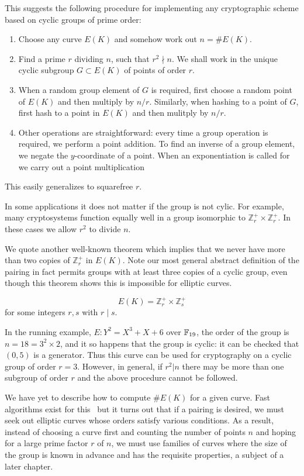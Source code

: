 This suggests the following procedure for implementing any cryptographic
scheme based on cyclic groups of prime order:

\begin{enumerate}
\item
Choose any curve $E(K)$ and somehow work out $n = \#E(K)$.
\item
Find a prime $r$ dividing $n$, such that $r^2 \nmid n$.
We shall work in the unique cyclic subgroup $G \subset E(K)$ of points
of order $r$.
\item
When a random group element of $G$ is required, first choose a random point
of $E(K)$ and then multiply by $n / r$. Similarly, when hashing to
a point of $G$, first hash to a point in $E(K)$ and then mulitply by
$n / r$.
\item
Other operations are straightforward: every time a group
operation is required, we perform a point addition. To find an inverse
of a group element, we negate the $y$-coordinate of a point. When
an exponentiation is called for we carry out a point multiplication
\end{enumerate}

This easily generalizes to squarefree $r$.

In some applications it does not matter if the group is not
cylic. For example, many cryptosystems function equally well
in a group isomorphic to $\mathbb{Z}_{r}^+ \times \mathbb{Z}_{r}^+$.
In these cases we allow $r^2$ to divide $n$.

We quote another well-known theorem which implies that we
never have more than two copies of $\mathbb{Z}_r^+$ in
$E(K)$.
Note our most general abstract definition of the pairing in fact permits
groups with at least three copies of a cyclic group, even though this
theorem shows this is impossible for elliptic curves.

\begin{theorem}
\[ E(K) = \mathbb{Z}_r^+ \times \mathbb{Z}_s^+ \]
for some integers $r,s$ with $r \mid s$.
\end{theorem}

In the running example, $E : Y^2 = X^3 + X + 6$ over $\mathbb{F}_{19}$,
the order of the group is $n = 18 = 3^2 \times 2$, and it so happens
that the group is cyclic: it can be checked that $(0,5)$ is a generator.
Thus this curve can be used
for cryptography on a cyclic group of order $r = 3$. However, in general,
if $r^2 | n$ there may be more than one subgroup of order $r$ and the
above procedure cannot be followed.

We have yet to describe how to compute $\#E(K)$ for a given curve.
Fast algorithms exist for this~\cite{bss}
but it turns out that if a pairing is desired, we must seek out
elliptic curves whose orders satisfy various conditions.
As a result,
instead of choosing a curve first and counting the number of points $n$ and
hoping for a large prime factor $r$ of $n$,
we must use families of curves where the size of the group
is known in advance and has the requisite properties,
a subject of a later chapter.

